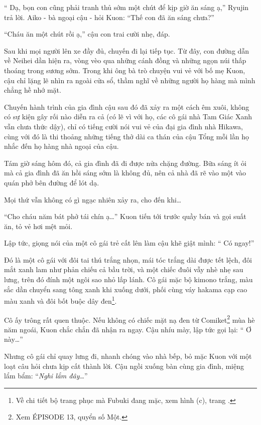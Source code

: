 \documentclass[../main.tex]{subfiles}
\begin{document}
``{\color{red} Dạ, bọn con cũng phải tranh thủ sớm một chút để kịp giờ ăn sáng ạ,}'' Ryujin trả lời. Aiko - bà ngoại cậu - hỏi Kuon: ``Thế con đã ăn sáng chưa?''

``{\color{red}Cháu ăn một chút rồi ạ,}'' cậu con trai cười nhẹ, đáp.

Sau khi mọi người lên xe đầy đủ, chuyến đi lại tiếp tục. Từ đây, con đường dẫn về Neihei dần hiện ra, vòng vèo qua những cánh đồng và những ngọn núi thấp thoáng trong sương sớm. Trong khi ông bà trò chuyện vui vẻ với bố mẹ Kuon, cậu chỉ lặng lẽ nhìn ra ngoài cửa sổ, thầm nghĩ về những người họ hàng mà mình chẳng hề nhớ mặt.

\ct

Chuyến hành trình của gia đình cậu sau đó đã xảy ra một cách êm xuôi, không có sự kiện gây rối nào diễn ra cả (có lẽ vì với họ, các cô gái nhà Tam Giác Xanh vẫn chưa thức dậy), chỉ có tiếng cười nói vui vẻ của đại gia đình nhà Hikawa, cùng với đó là thi thoảng những tiếng thở dài ca thán của cậu Tổng mỗi lần họ nhắc đến họ hàng nhà ngoại của cậu.

Tám giờ sáng hôm đó, cả gia đình đã đi được nửa chặng đường. Bữa sáng ít ỏi mà cả gia đình đã ăn hồi sáng sớm là không đủ, nên cả nhà đã rẽ vào một vào quán phở bên đường để lót dạ.

Mọi thứ vẫn không có gì ngạc nhiên xảy ra, cho đến khi\dots

``{\color{red}Cho cháu năm bát phở tái chín ạ\dots}'' Kuon tiến tới trước quầy bán và gọi suất ăn, tỏ vẻ hơi mệt mỏi.

Lập tức, giọng nói của một cô gái trẻ cất lên làm cậu khẽ giật mình: ``{\color{red} Có ngay!}''

Đó là một cô gái với đôi tai thú trắng nhọn, mái tóc trắng dài được tết lệch, đôi mắt xanh lam như phản chiếu cả bầu trời, và một chiếc đuôi vẫy nhè nhẹ sau lưng, trên đó đính một ngôi sao nhỏ lấp lánh. Cô gái mặc bộ kimono trắng, màu sắc dần chuyển sang tông xanh khi xuống dưới, phối cùng váy hakama cạp cao màu xanh và đôi bốt buộc dây đen\footnote{Về chi tiết bộ trang phục mà Fubuki đang mặc, xem hình (c), trang \pageref{setone}.}.

Cô ấy trông rất quen thuộc. Nếu không có chiếc mặt nạ đen từ Comiket\footnote{Xem {\flaregothic ÉPISODE 13}, quyển số Một.} mùa hè năm ngoái, Kuon chắc chắn đã nhận ra ngay. Cậu nhíu mày, lập tức gọi lại: ``{\color{red} Ơ này\dots}''

Nhưng cô gái chỉ quay lưng đi, nhanh chóng vào nhà bếp, bỏ mặc Kuon với một loạt câu hỏi chưa kịp cất thành lời. Cậu ngồi xuống bàn cùng gia đình, miệng lẩm bẩm: ``\textit{Nghi lắm đây\dots}''
\end{document}
